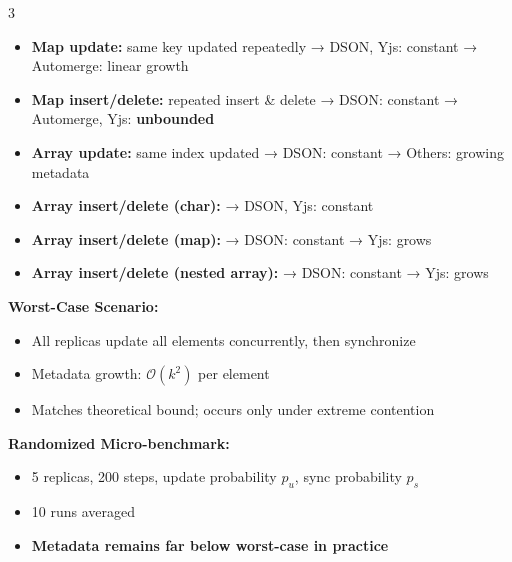 \documentclass[a0,portrait]{a0poster}
\begin{document}
\begin{multicols}{3}
\begin{itemize}

\item \textbf{Map update:} same key updated repeatedly  
\hspace{0.5cm} → DSON, Yjs: constant  
\hspace{0.5cm} → Automerge: linear growth  

\item \textbf{Map insert/delete:} repeated insert \& delete  
\hspace{0.5cm} → DSON: constant  
\hspace{0.5cm} → Automerge, Yjs: \textbf{unbounded}  

\item \textbf{Array update:} same index updated  
\hspace{0.5cm} → DSON: constant  
\hspace{0.5cm} → Others: growing metadata  

\item \textbf{Array insert/delete (char):}  
\hspace{0.5cm} → DSON, Yjs: constant  

\item \textbf{Array insert/delete (map):}  
\hspace{0.5cm} → DSON: constant  
\hspace{0.5cm} → Yjs: grows  

\item \textbf{Array insert/delete (nested array):}  
\hspace{0.5cm} → DSON: constant  
\hspace{0.5cm} → Yjs: grows  

\end{itemize}

\vspace{0.3cm}

\textbf{Worst-Case Scenario:}
\begin{itemize}
\item All replicas update all elements concurrently, then synchronize
\item Metadata growth: $\mathcal{O}(k^2)$ per element
\item Matches theoretical bound; occurs only under extreme contention
\end{itemize}

\vspace{0.2cm}

\textbf{Randomized Micro-benchmark:}
\begin{itemize}
\item 5 replicas, 200 steps, update probability $p_u$, sync probability $p_s$
\item 10 runs averaged
\item \textbf{Metadata remains far below worst-case in practice}
\end{itemize}


\end{multicols}
\end{document}

